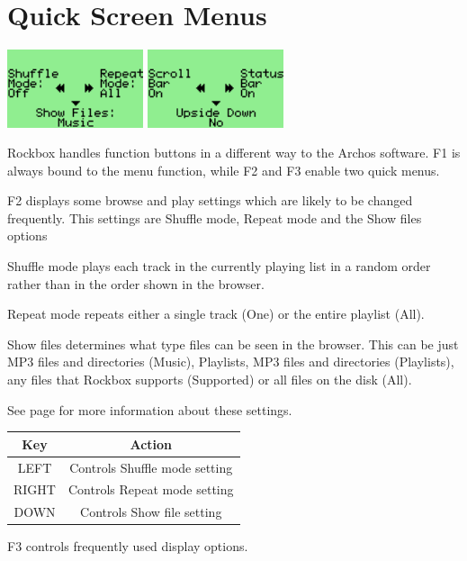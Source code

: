 \section{\label{ref:QuickScreenMenus}Quick Screen Menus}
\begin{center}
  \includegraphics[width=4cm]{rockbox_interface/images/ss-quick-screen-112x64x1.png}
  \includegraphics[width=4cm]{rockbox_interface/images/ss-quick-screen2-112x64x1.png}
\end{center}
Rockbox handles function buttons in a different way to the Archos software. F1 is always bound to the menu function, while F2 and F3 enable two quick menus.

F2 displays some browse and play settings which are likely to be changed frequently. This settings are Shuffle mode, Repeat mode and the Show files options

Shuffle mode plays each track in the currently playing list in a random order rather than in the order shown in the browser.

Repeat mode repeats either a single track (One) or the entire playlist (All).

Show files determines what type files can be seen in the browser.  This can be just MP3 files and directories (Music), Playlists, MP3 files and directories  (Playlists), any files that Rockbox supports (Supported) or all files on the disk (All).

See page \pageref{ref:PlaybackOptions} for more information about these settings.

\begin{table}[h!]
  \begin{center}
    \begin{tabular}{@{}cc@{}}\toprule
      \textbf{Key} & \textbf{Action} \\\midrule
      LEFT & Controls Shuffle mode setting \\
      RIGHT & Controls Repeat mode setting \\
      DOWN & Controls Show file setting \\\bottomrule
    \end{tabular}
  \end{center}
\end{table}
F3 controls frequently used display options.

